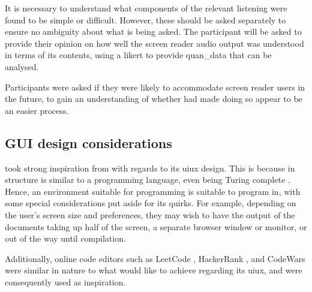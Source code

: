 It is necessary to understand what components of the relevant listening were found to be simple or difficult. However, these should be asked separately to ensure no ambiguity about what is being asked. The participant will be asked to provide their opinion on how well the screen reader audio output was understood in terms of its contents, using a \gls{likert} to provide \gls{quan_data} that can be analysed.

Participants were asked if they were likely to accommodate screen reader users in the future, to gain an understanding of whether \lintexspaced had made doing so appear to be an easier process.
\subsection{GUI design considerations}
\lintexspaced took strong inspiration from  with regards to its \acrfull{uiux} design. This is because \latexspaced in structure is similar to a programming language, even being Turing complete \parencite{latexturingcomplete}. Hence, an environment suitable for programming is suitable to program \latexspaced in, with some special considerations put aside for its quirks. For example, depending on the user's screen size and preferences, they may wish to have the output of the \latexspaced documents taking up half of the screen, a separate browser window or monitor, or out of the way until compilation.

Additionally, online code editors such as LeetCode \parencite{leetcode}, HackerRank \parencite{hackerrank}, and CodeWars \parencite{codewars} were similar in nature to what \lintexspaced would like to achieve regarding its \acrshort{uiux}, and were consequently used as inspiration.